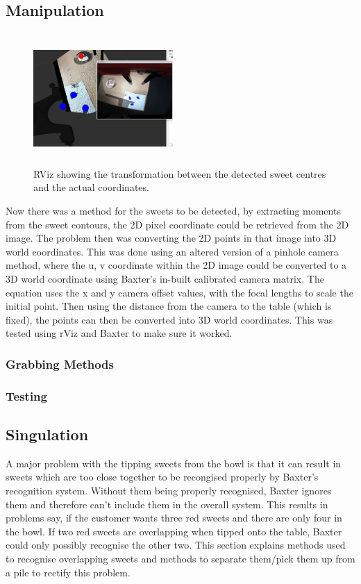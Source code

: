 \subsection{Manipulation}
\captionsetup[figure]{justification=centering}
\begin{figure}[H]
        \centering 
        \includegraphics[width=0.475\textwidth, height=5cm]{sweettransformation.jpg}
        \caption{RViz showing the transformation between the detected sweet centres and the actual coordinates.}
        \label{fig:morphAnalysis}
\end{figure}
Now there was a method for the sweets to be detected, by extracting moments from the sweet contours, the 2D pixel coordinate could be retrieved from the 2D image. The problem then was converting the 2D points in that image into 3D world coordinates. This was done using an altered version of a pinhole camera method, where the u, v coordinate within the 2D image could be converted to a 3D world coordinate using Baxter's in-built calibrated camera matrix. The equation uses the x and y camera offset values, with the focal lengths to scale the initial point. Then using the distance from the camera to the table (which is fixed), the points can then be converted into 3D world coordinates. This was tested using rViz and Baxter to make sure it worked.
\subsubsection{Grabbing Methods}
\subsubsection{Testing}
\subsection{Singulation}
A major problem with the tipping sweets from the bowl is that it can result in sweets which are too close together to be recongised properly by Baxter's recognition system. Without them being properly recognised, Baxter ignores them and therefore can't include them in the overall system. This results in problems say, if the customer wants three red sweets and there are only four in the bowl. If two red sweets are overlapping when tipped onto the table, Baxter could only possibly recognise the other two. This section explains methods used to recognise overlapping sweets and methods to separate them/pick them up from a pile to rectify this problem.
